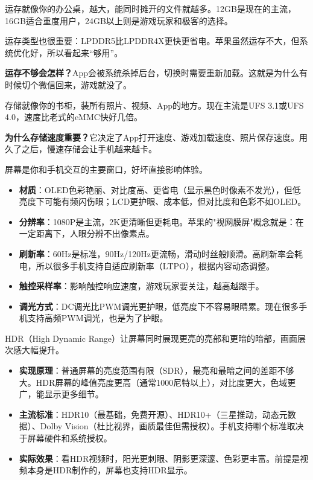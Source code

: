 
运存就像你的办公桌，越大，能同时摊开的文件就越多。12GB是现在的主流，16GB适合重度用户，24GB以上则是游戏玩家和极客的选择。

运存类型也很重要：LPDDR5比LPDDR4X更快更省电。苹果虽然运存不大，但系统优化好，所以看起来“够用”。

\textbf{运存不够会怎样？}App会被系统杀掉后台，切换时需要重新加载。这就是为什么有时候切个微信回来，游戏就没了。


存储就像你的书柜，装所有照片、视频、App的地方。现在主流是UFS 3.1或UFS 4.0，速度比老式的eMMC快好几倍。

\textbf{为什么存储速度重要？}它决定了App打开速度、游戏加载速度、照片保存速度。用久了之后，慢速存储会让手机越来越卡。


屏幕是你和手机交互的主要窗口，好坏直接影响体验。

\begin{itemize}
  \item \textbf{材质}：OLED色彩艳丽、对比度高、更省电（显示黑色时像素不发光），但低亮度下可能有频闪伤眼；LCD更护眼、成本低，但对比度和色彩不如OLED。
  \item \textbf{分辨率}：1080P是主流，2K更清晰但更耗电。苹果的"视网膜屏"概念就是：在一定距离下，人眼分辨不出像素点。
  \item \textbf{刷新率}：60Hz是标准，90Hz/120Hz更流畅，滑动时丝般顺滑。高刷新率会耗电，所以很多手机支持自适应刷新率（LTPO），根据内容动态调整。
  \item \textbf{触控采样率}：影响触控响应速度，游戏玩家要关注，越高越跟手。
  \item \textbf{调光方式}：DC调光比PWM调光更护眼，低亮度下不容易眼睛累。现在很多手机支持高频PWM调光，也是为了护眼。
\end{itemize}


HDR（High Dynamic Range）让屏幕同时展现更亮的亮部和更暗的暗部，画面层次感大幅提升。

\begin{itemize}
  \item \textbf{实现原理}：普通屏幕的亮度范围有限（SDR），最亮和最暗之间的差距不够大。HDR屏幕的峰值亮度更高（通常1000尼特以上），对比度更大，色域更广，能显示更多细节。
  \item \textbf{主流标准}：HDR10（最基础，免费开源）、HDR10+（三星推动，动态元数据）、Dolby Vision（杜比视界，画质最佳但需授权）。手机支持哪个标准取决于屏幕硬件和系统授权。
  \item \textbf{实际效果}：看HDR视频时，阳光更刺眼、阴影更深邃、色彩更丰富。前提是视频本身是HDR制作的，屏幕也支持HDR显示。
\end{itemize}


